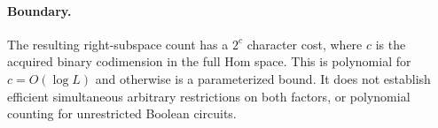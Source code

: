 \documentclass[11pt]{article}
\begin{document}
\paragraph{Boundary.}
The resulting right-subspace count has a $2^c$ character cost, where
$c$ is the acquired binary codimension in the full Hom space. This
is polynomial for $c=O(\log L)$ and otherwise is a parameterized bound.
It does not establish efficient simultaneous arbitrary restrictions on
both factors, or polynomial counting for unrestricted Boolean circuits.
\end{document}
